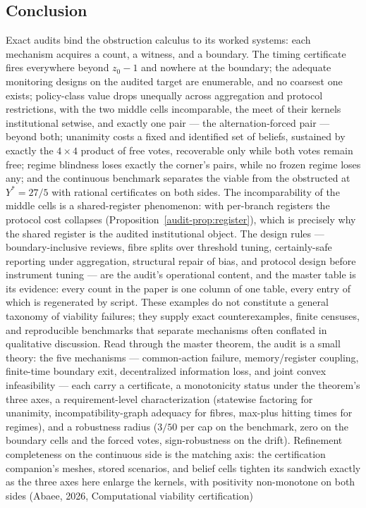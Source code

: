 \documentclass[10pt,twocolumn]{article}
\theoremstyle{plain}
\theoremstyle{definition}
\theoremstyle{remark}
\begin{document}
\subsection{Conclusion}\label{audit-conclusion}

Exact audits bind the obstruction calculus to its worked systems: each
mechanism acquires a count, a witness, and a boundary. The timing
certificate fires everywhere beyond \(z_0 - 1\) and nowhere at the
boundary; the adequate monitoring designs on the audited target are
enumerable, and no coarsest one exists; policy-class value drops
unequally across aggregation and protocol restrictions, with the two
middle cells incomparable, the meet of their kernels institutional
setwise, and exactly one pair --- the alternation-forced pair --- beyond
both; unanimity costs a fixed and identified set of beliefs, sustained
by exactly the \(4 \times 4\) product of free votes, recoverable only
while both votes remain free; regime blindness loses exactly the
corner's pairs, while no frozen regime loses any; and the continuous
benchmark separates the viable from
the obstructed at \(Y^{*} = 27/5\) with rational certificates on both
sides. The incomparability of the middle cells is a shared-register
phenomenon: with per-branch registers the protocol cost collapses
(Proposition~\ref{audit-prop:register}), which is precisely why the shared
register is the audited institutional object. The design rules --- boundary-inclusive reviews, fibre splits
over threshold tuning, certainly-safe reporting under aggregation,
structural repair of bias, and protocol design before instrument tuning
--- are the audit's operational content, and the master table is its
evidence: every count in the paper is one column of one table, every entry of which is regenerated by script. These examples do not constitute a general taxonomy of viability failures; they supply exact counterexamples, finite censuses, and reproducible benchmarks that separate mechanisms often conflated in qualitative discussion. Read through the master theorem, the audit is a small theory: the five mechanisms --- common-action failure, memory/register coupling, finite-time boundary exit, decentralized information loss, and joint convex infeasibility --- each carry a certificate, a monotonicity status under the theorem's three axes, a requirement-level characterization (statewise factoring for unanimity, incompatibility-graph adequacy for fibres, max-plus hitting times for regimes), and a robustness radius (\(3/50\) per cap on the benchmark, zero on the boundary cells and the forced votes, sign-robustness on the drift). Refinement completeness on the continuous side is the matching axis: the certification companion's meshes, stored scenarios, and belief cells tighten its sandwich exactly as the three axes here enlarge the kernels, with positivity non-monotone on both sides (Abaee, 2026, Computational viability certification)
\end{document}
